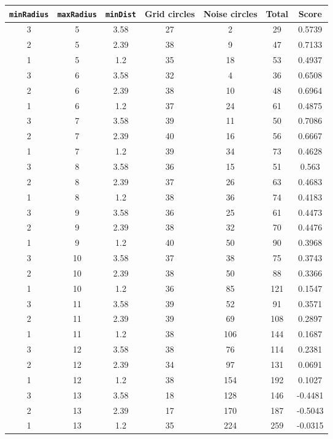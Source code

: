 \documentclass[letterpaper, 12pt]{article}
\begin{document}
\begin{longtable}{|c|c|c|c|c|c|c|}
\hline
\textbf{\texttt{minRadius}} & \textbf{\texttt{maxRadius}} & \textbf{\texttt{minDist}} & \textbf{Grid circles} & \textbf{Noise circles} & \textbf{Total} & \textbf{Score} \\
\hline
3 & 5 & 3.58 & 27 & 2 & 29 & 0.5739 \\
\hline
2 & 5 & 2.39 & 38 & 9 & 47 & 0.7133 \\
\hline
1 & 5 & 1.2 & 35 & 18 & 53 & 0.4937 \\
\hline
3 & 6 & 3.58 & 32 & 4 & 36 & 0.6508 \\
\hline
2 & 6 & 2.39 & 38 & 10 & 48 & 0.6964 \\
\hline
1 & 6 & 1.2 & 37 & 24 & 61 & 0.4875 \\
\hline
3 & 7 & 3.58 & 39 & 11 & 50 & 0.7086 \\
\hline
2 & 7 & 2.39 & 40 & 16 & 56 & 0.6667 \\
\hline
1 & 7 & 1.2 & 39 & 34 & 73 & 0.4628 \\
\hline
3 & 8 & 3.58 & 36 & 15 & 51 & 0.563 \\
\hline
2 & 8 & 2.39 & 37 & 26 & 63 & 0.4683 \\
\hline
1 & 8 & 1.2 & 38 & 36 & 74 & 0.4183 \\
\hline
3 & 9 & 3.58 & 36 & 25 & 61 & 0.4473 \\
\hline
2 & 9 & 2.39 & 38 & 32 & 70 & 0.4476 \\
\hline
1 & 9 & 1.2 & 40 & 50 & 90 & 0.3968 \\
\hline
3 & 10 & 3.58 & 37 & 38 & 75 & 0.3743 \\
\hline
2 & 10 & 2.39 & 38 & 50 & 88 & 0.3366 \\
\hline
1 & 10 & 1.2 & 36 & 85 & 121 & 0.1547 \\
\hline
3 & 11 & 3.58 & 39 & 52 & 91 & 0.3571 \\
\hline
2 & 11 & 2.39 & 39 & 69 & 108 & 0.2897 \\
\hline
1 & 11 & 1.2 & 38 & 106 & 144 & 0.1687 \\
\hline
3 & 12 & 3.58 & 38 & 76 & 114 & 0.2381 \\
\hline
2 & 12 & 2.39 & 34 & 97 & 131 & 0.0691 \\
\hline
1 & 12 & 1.2 & 38 & 154 & 192 & 0.1027 \\
\hline
3 & 13 & 3.58 & 18 & 128 & 146 & -0.4481 \\
\hline
2 & 13 & 2.39 & 17 & 170 & 187 & -0.5043 \\
\hline
1 & 13 & 1.2 & 35 & 224 & 259 & -0.0315 \\

\end{longtable}
\end{document}

